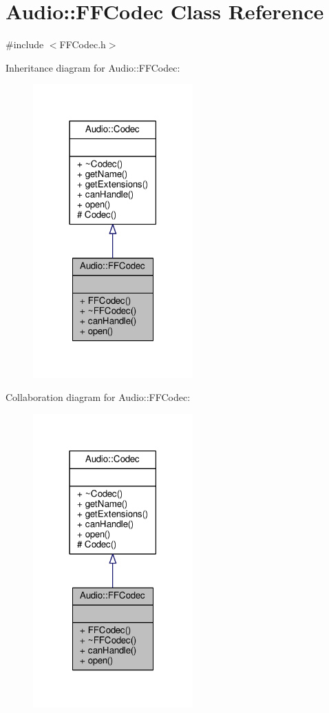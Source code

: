 \hypertarget{classAudio_1_1FFCodec}{}\section{Audio\+:\+:F\+F\+Codec Class Reference}
\label{classAudio_1_1FFCodec}


{\ttfamily \#include $<$F\+F\+Codec.\+h$>$}



Inheritance diagram for Audio\+:\+:F\+F\+Codec\+:
\nopagebreak
\begin{figure}[H]
\begin{center}
\leavevmode
\includegraphics[width=174pt]{d4/dd4/classAudio_1_1FFCodec__inherit__graph}
\end{center}
\end{figure}


Collaboration diagram for Audio\+:\+:F\+F\+Codec\+:
\nopagebreak
\begin{figure}[H]
\begin{center}
\leavevmode
\includegraphics[width=174pt]{d1/d0e/classAudio_1_1FFCodec__coll__graph}
\end{center}
\end{figure}
